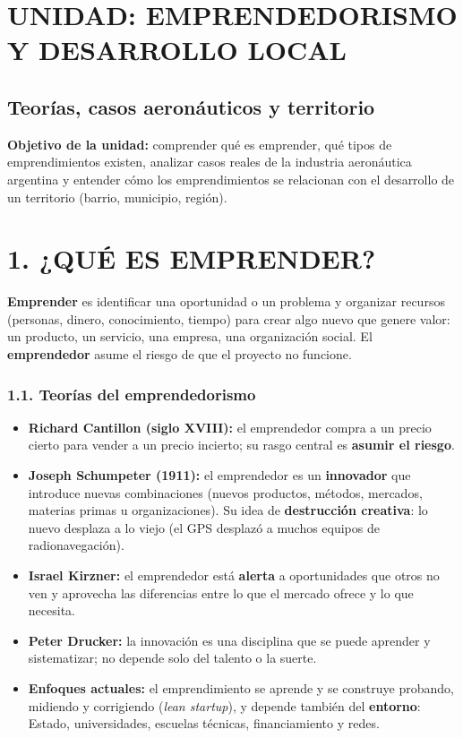 \clearpage
\section*{UNIDAD: EMPRENDEDORISMO Y DESARROLLO LOCAL}
\subsection*{Teorías, casos aeronáuticos y territorio}

\begin{recuadro}
\textbf{Objetivo de la unidad:} comprender qué es emprender, qué tipos de emprendimientos
existen, analizar casos reales de la industria aeronáutica argentina y entender cómo los
emprendimientos se relacionan con el desarrollo de un territorio (barrio, municipio, región).
\end{recuadro}

\section*{1. ¿QUÉ ES EMPRENDER?}

\textbf{Emprender} es identificar una oportunidad o un problema y organizar recursos (personas,
dinero, conocimiento, tiempo) para crear algo nuevo que genere valor: un producto, un servicio,
una empresa, una organización social. El \textbf{emprendedor} asume el riesgo de que el
proyecto no funcione.

\subsubsection*{1.1. Teorías del emprendedorismo}
\begin{itemize}
  \item \textbf{Richard Cantillon (siglo XVIII):} el emprendedor compra a un precio cierto
        para vender a un precio incierto; su rasgo central es \textbf{asumir el riesgo}.
  \item \textbf{Joseph Schumpeter (1911):} el emprendedor es un \textbf{innovador} que
        introduce nuevas combinaciones (nuevos productos, métodos, mercados, materias primas u
        organizaciones). Su idea de \textbf{destrucción creativa}: lo nuevo desplaza a lo viejo
        (el GPS desplazó a muchos equipos de radionavegación).
  \item \textbf{Israel Kirzner:} el emprendedor está \textbf{alerta} a oportunidades que otros
        no ven y aprovecha las diferencias entre lo que el mercado ofrece y lo que necesita.
  \item \textbf{Peter Drucker:} la innovación es una disciplina que se puede aprender y
        sistematizar; no depende solo del talento o la suerte.
  \item \textbf{Enfoques actuales:} el emprendimiento se aprende y se construye probando,
        midiendo y corrigiendo (\textit{lean startup}), y depende también del \textbf{entorno}:
        Estado, universidades, escuelas técnicas, financiamiento y redes.
\end{itemize}

